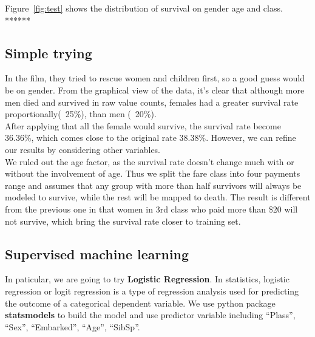 \documentclass{article}
\begin{document}
Figure~\ref{fig:test} shows the distribution of survival on gender age and class. ******


\subsection{Simple trying}
In the film, they tried to rescue women and children first, so a good guess would be on gender. From the graphical view of the data, it’s clear that although more men died and survived in raw value counts, females had a greater survival rate proportionally(~25\%), than men (~20\%).\\

After applying that all the female would survive, the survival rate become 36.36\%, which comes close to the original rate 38.38\%. However, we can refine our results by considering other variables.\\

We ruled out the age factor, as the survival rate doesn't change much with or without the involvement of age. Thus we split the fare class into four payments range and assumes that any group with more than half survivors will always be modeled to survive, while the rest will be mapped to death. The result is different from the previous one in that women in 3rd class who paid more than \$20 will not survive, which bring the survival rate closer to training set.



\subsection{Supervised machine learning}

In paticular, we are going to try \textbf{Logistic Regression}. In statistics, logistic regression or logit regression is a type of regression analysis used for predicting the outcome of a categorical dependent variable. We use python package \textbf{statsmodels} to build the model and use predictor variable including ``Plass'', ``Sex'', ``Embarked'', ``Age'', ``SibSp''. \\
\end{document}
